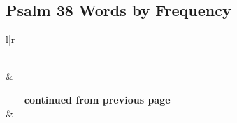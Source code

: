

\subsection{Psalm 38 Words by Frequency}


\normalsize
 
\begin{center}
\begin{longtable}{l|r}
\caption[Psalm 38 Words by Frequency]{Psalm 38 Words by Frequency}\label{table:WordsbyFrequency for Psalm 38} \\
\hline {} &  \\ \hline 
\endfirsthead
 
{{\bfseries \tablename\ \thetable{} -- continued from previous page}} \\  
\hline {} &  \\ \hline 
\endhead
 

\end{longtable}
\end{center}
